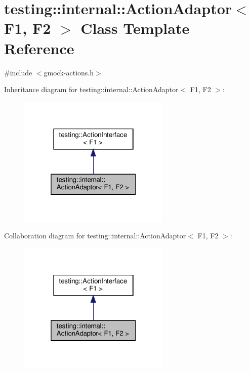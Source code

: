 \hypertarget{classtesting_1_1internal_1_1_action_adaptor}{}\section{testing\+:\+:internal\+:\+:Action\+Adaptor$<$ F1, F2 $>$ Class Template Reference}
\label{classtesting_1_1internal_1_1_action_adaptor}


{\ttfamily \#include $<$gmock-\/actions.\+h$>$}



Inheritance diagram for testing\+:\+:internal\+:\+:Action\+Adaptor$<$ F1, F2 $>$\+:
\nopagebreak
\begin{figure}[H]
\begin{center}
\leavevmode
\includegraphics[width=205pt]{classtesting_1_1internal_1_1_action_adaptor__inherit__graph}
\end{center}
\end{figure}


Collaboration diagram for testing\+:\+:internal\+:\+:Action\+Adaptor$<$ F1, F2 $>$\+:
\nopagebreak
\begin{figure}[H]
\begin{center}
\leavevmode
\includegraphics[width=205pt]{classtesting_1_1internal_1_1_action_adaptor__coll__graph}
\end{center}
\end{figure}
